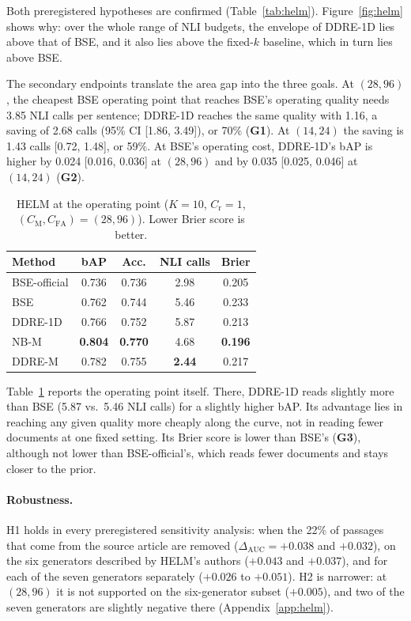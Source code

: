 \documentclass[11pt]{article}
\newcommand{\CM}{C_{\mathrm{M}}}
\newcommand{\CFA}{C_{\mathrm{FA}}}
\newcommand{\Cr}{C_{\mathrm{r}}}
\begin{document}
Both preregistered hypotheses are confirmed (Table~\ref{tab:helm}).
Figure~\ref{fig:helm} shows why: over the whole range of NLI budgets, the
envelope of DDRE-1D lies above that of BSE, and it also lies above the
fixed-$k$ baseline, which in turn lies above BSE.

The secondary endpoints translate the area gap into the three goals. At
$(28, 96)$, the cheapest BSE operating point that reaches BSE's operating
quality needs 3.85 NLI calls per sentence; DDRE-1D reaches the same quality
with 1.16, a saving of 2.68 calls (95\% CI [1.86, 3.49]), or 70\%
(\textbf{G1}). At $(14, 24)$ the saving is 1.43 calls [0.72, 1.48], or 59\%.
At BSE's operating cost, DDRE-1D's bAP is higher by 0.024 [0.016, 0.036] at
$(28, 96)$ and by 0.035 [0.025, 0.046] at $(14, 24)$ (\textbf{G2}).

\begin{table}[t]
\centering\small
\setlength{\tabcolsep}{3pt}
\begin{tabular}{@{}lcccc@{}}
\toprule
Method & bAP & Acc. & NLI calls & Brier \\
\midrule
BSE-official & 0.736 & 0.736 & 2.98 & 0.205 \\
BSE & 0.762 & 0.744 & 5.46 & 0.233 \\
DDRE-1D & 0.766 & 0.752 & 5.87 & 0.213 \\
NB-M & \textbf{0.804} & \textbf{0.770} & 4.68 & \textbf{0.196} \\
DDRE-M & 0.782 & 0.755 & \textbf{2.44} & 0.217 \\
\bottomrule
\end{tabular}
\caption{HELM at the operating point ($K = 10$, $\Cr = 1$,
$(\CM, \CFA) = (28, 96)$). Lower Brier score is better.}
\label{tab:operating}
\end{table}

Table~\ref{tab:operating} reports the operating point itself. There, DDRE-1D
reads slightly more than BSE (5.87 vs.\ 5.46 NLI calls) for a slightly higher
bAP. Its advantage lies in reaching any given quality more cheaply along the
curve, not in reading fewer documents at one fixed setting. Its Brier score is
lower than BSE's (\textbf{G3}), although not lower than BSE-official's, which
reads fewer documents and stays closer to the prior.

\paragraph{Robustness.} H1 holds in every preregistered sensitivity analysis:
when the 22\% of passages that come from the source article are removed
($\Delta_{\mathrm{AUC}} = +0.038$ and $+0.032$), on the six generators
described by HELM's authors ($+0.043$ and $+0.037$), and for each of the seven
generators separately ($+0.026$ to $+0.051$). H2 is narrower: at $(28, 96)$
it is not supported on the six-generator subset ($+0.005$), and two of the
seven generators are slightly negative there (Appendix~\ref{app:helm}).
\end{document}
